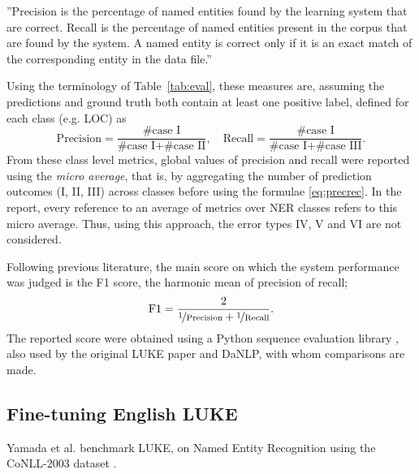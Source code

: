 \documentclass[main.tex]{subfiles}
\begin{document}
''Precision is the percentage of named entities found by the learning system that are correct.
Recall is the percentage of named entities present in the corpus that are found by the system.
A named entity is correct only if it is an exact match of the corresponding entity in the data file.''
\cite[Sec 2.4]{tjang2003conll}

Using the terminology of Table~\ref{tab:eval}, these measures are, assuming the predictions and ground truth both contain at least one positive label, defined for each class (e.g. LOC) as
\begin{equation}
    \label{eq:precrec}
    \text{Precision} = \frac{\text{\# case I}}{\text{\# case I} + \text{\# case II}},\quad \text{Recall} = \frac{\text{\# case I}}{\text{\# case I} + \text{\# case III}}.
\end{equation}
From these class level metrics, global values of precision and recall were reported using the \emph{micro average}, that is, by aggregating the number of prediction outcomes (I, II, III) across classes before using the formulae \eqref{eq:precrec}.
In the report, every reference to an average of metrics over NER classes refers to this micro average.
Thus, using this approach, the error types IV, V and VI are not considered\footnotemark.

Following previous literature, the main score on which the system performance was judged is the F1 score, the harmonic mean of precision of recall;
\begin{equation}
    \label{eq:f1}
    \text{F1} = \dfrac{2}{\nicefrac 1 {\text{Precision}} + \nicefrac 1 {\text{Recall}}}.
\end{equation}
The reported score were obtained using a Python sequence evaluation library \cite{seqeval}, also used by the original LUKE paper and DaNLP, with whom comparisons are made.
\subsection{Fine-tuning English LUKE}
Yamada et al. benchmark LUKE, on Named Entity Recognition using the CoNLL-2003 dataset \cite{yamada2020luke}.
\end{document}
